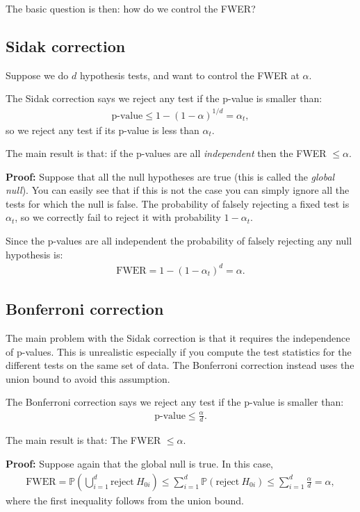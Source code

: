 \documentclass[twoside,12pt]{article}
\begin{document}
The basic question is then: how do we control the FWER?

\subsection{Sidak correction}
Suppose we do $d$ hypothesis tests, and want to control the FWER 
at $\alpha$. 

The Sidak correction says we reject any test if the p-value 
is smaller than:
\begin{align*}
\text{p-value} \leq 1 - (1 - \alpha)^{1/d} = \alpha_t,
\end{align*}
so we reject any test if its p-value is less than $\alpha_t$.

The main result is that: if the p-values are all \emph{independent} then the FWER $\leq \alpha$.

{\bf Proof: } Suppose that all the null hypotheses are true (this is called the \emph{global null}). You can easily see that if this is not the case you can simply ignore all the tests for which the null is false. 
The probability of falsely rejecting a fixed test is $\alpha_t$, so we correctly fail to reject it with probability $1 - \alpha_t$. 

Since the p-values are all independent the probability of falsely rejecting any null hypothesis is:
\begin{align*}
\text{FWER} = 1 - (1 - \alpha_t)^d = \alpha.
\end{align*}




\subsection{Bonferroni correction}
The main problem with the Sidak correction is that it requires the independence of p-values. 
This is unrealistic especially if you compute the test statistics for the different tests on the same
set of data. The Bonferroni
correction instead uses the union bound to avoid this assumption.

The Bonferroni correction says we reject any test if the p-value is smaller than:
\begin{align*}
\text{p-value} \leq \frac{\alpha}{d}.
\end{align*}

The main result is that: The FWER $\leq \alpha$.

{\bf Proof: } Suppose again that the global null is true. In this case,
\begin{align*}
\text{FWER} = \mathbb{P}\left(\bigcup_{i=1}^d \text{reject}~H_{0i}\right) \leq
\sum_{i=1}^d \mathbb{P} \left( \text{reject}~H_{0i}\right) \leq \sum_{i=1}^d \frac{\alpha}{d} = \alpha,
\end{align*}
where the first inequality follows from the union bound.
\end{document}
